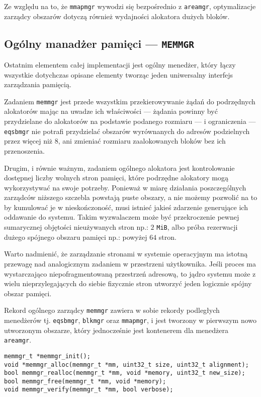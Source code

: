\documentclass[12pt,a4paper,titlepage,twoside]{mwart}
\begin{document}
Ze względu na to, że \verb+mmapmgr+ wywodzi się bezpośrednio z \verb+areamgr+,
optymalizacje zarządcy obszarów dotyczą również wydajności alokatora dużych
bloków.

\newpage

\subsection{Ogólny manadżer pamięci --- \texttt{MEMMGR}}

Ostatnim elementem całej implementacji jest ogólny menedżer, który łączy
wszystkie dotychczas opisane elementy tworząc jeden uniwersalny interfejs
zarządzania pamięcią.

Zadaniem \verb+memmgr+ jest przede wszystkim przekierowywanie żądań do
podrzędnych alokatorów mając na uwadze ich właściwości --- żądania powinny być
przydzielane do alokatorów na podstawie podanego rozmiaru --- i ograniczenia
--- \verb+eqsbmgr+ nie potrafi przydzielać obszarów wyrównanych do adresów
podzielnych przez więcej niż $8$, ani zmieniać rozmiaru zaalokowanych bloków
bez ich przenoszenia.

Drugim, i równie ważnym, zadaniem ogólnego alokatora jest kontrolowanie
dostępnej liczby wolnych stron pamięci, które podrzędne alokatory mogą
wykorzystywać na swoje potrzeby. Ponieważ w miarę działania poszczególnych
zarządców niższego szczebla powstają puste obszary, a nie możemy pozwolić na to
by kumulować je w nieskończoność, musi istnieć jakieś zdarzenie generujące ich
oddawanie do systemu. Takim wyzwalaczem może być przekroczenie pewnej
sumarycznej objętości nieużywanych stron np.: $2$ \verb+MiB+, albo próba
rezerwacji dużego spójnego obszaru pamięci np.: powyżej $64$ stron. 

Warto nadmienić, że zarządzanie stronami w systemie operacyjnym ma istotną
przewagę nad analogicznym zadaniem w przestrzeni użytkownika. Jeśli proces ma
wystarczająco niepofragmentowaną przestrzeń adresową, to jądro systemu może z
wielu nieprzylegających do siebie fizycznie stron utworzyć jeden logicznie
spójny obszar pamięci.

Rekord ogólnego zarządcy \verb+memmgr+ zawiera w sobie rekordy podległych
menedżerów tj. \verb+eqsbmgr+, \verb+blkmgr+ oraz \verb+mmapmgr+, i jest
tworzony w pierwszym nowo utworzonym obszarze, który jednocześnie jest
kontenerem dla menedżera \verb+areamgr+. 

\vspace{2ex}
\begin{lstlisting}[caption={Prototypy funkcji menedżera pamięci \texttt{memmgr}.},xleftmargin=1cm,xrightmargin=1cm]
memmgr_t *memmgr_init();
void *memmgr_alloc(memmgr_t *mm, uint32_t size, uint32_t alignment);
bool memmgr_realloc(memmgr_t *mm, void *memory, uint32_t new_size);
bool memmgr_free(memmgr_t *mm, void *memory);
void memmgr_verify(memmgr_t *mm, bool verbose);
\end{lstlisting}
\end{document}
